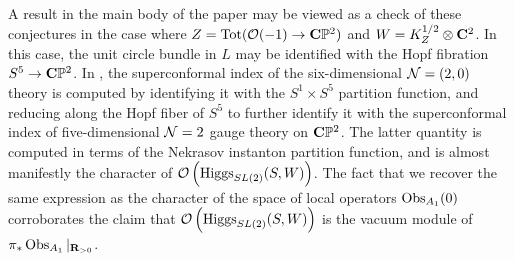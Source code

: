 A result in the main body of the paper may be viewed as a check of these conjectures in the case where $Z = \operatorname{Tot}(\mathcal O(-1)\to \mathbf{C}\mathbb P^{2})$ and $W = K^{1/2}_{Z}\otimes \mathbf{C}^{2}$. In this case, the unit circle bundle in $L$ may be identified with the Hopf fibration $S^{5}\to \mathbf{C}\mathbb P^{2}$. In \cite{Kim:2013nva}, the superconformal index of the six-dimensional $\mathcal N=(2,0)$ theory is computed by identifying it with the $S^{1}\times S^{5}$ partition function, and reducing along the Hopf fiber of $S^{5}$ to further identify it with the superconformal index of five-dimensional $\mathcal N=2$ gauge theory on $\mathbf{C}\mathbb P^{2}$. The latter quantity is computed in terms of the Nekrasov instanton partition function, and is almost manifestly the character of $\mathcal O \left ( \operatorname{Higgs} _{SL(2)}(S, W)\right)$. 
The fact that we recover the same expression as the character of the space of local operators $\operatorname{Obs}_{A_1}(0)$ corroborates the claim that $ \mathcal O \left ( \operatorname{Higgs} _{SL(2)}(S, W)\right)$ is the vacuum module of $\pi_{*}\operatorname{Obs}_{A_1}|_{\mathbf{R}_{>0}}$.





%
